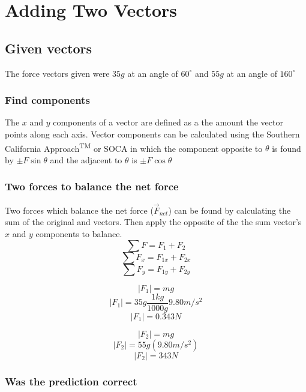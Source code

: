 \documentclass[11pt, letterpaper, includehead]{article}
\begin{document}
\tableofcontents
\pagebreak %

\pagestyle{fancy}
\fancyhead{}

\pagebreak 

\section{Adding Two Vectors} %

\subsection{Given vectors} %
The force vectors given were $35g$ at an angle of $60^{\circ}$ and $55g$ at an angle of $160^{\circ}$

\subsubsection{Find components} %
The $x$ and $y$ components of a vector are defined as a the amount the vector 
points along each axis. Vector components can be calculated using the Southern 
California Approach\textsuperscript{TM} or SOCA in which the component opposite to
$\theta$ is found by $\pm F \sin\theta$ and the adjacent to $\theta$ is $\pm F \cos\theta$

\subsubsection{Two forces to balance the net force} %
Two forces which balance the net force ($\vec{F}_{net}$) can be found by calculating the sum of 
the original and vectors. Then apply the opposite of the the sum vector's $x$ and $y$ components to balance.
$$\sum F = F_{1} + F_{2}$$
$$\sum F_x = F_{1x} + F_{2x}$$
$$\sum F_y = F_{1y} + F_{2y}$$

$$|F_1| = mg$$
$$|F_1| = 35g\frac{1kg}{1000g}9.80m/s^2$$
$$|F_1| = 0.343N$$

$$|F_2| = mg$$
$$|F_2| = 55g(9.80m/s^2)$$
$$|F_2| = 343N$$

\subsubsection{Was the prediction correct} %
\end{document}
